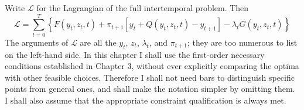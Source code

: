 Write $\mathcal{L}$ for the Lagrangian of the full intertemporal problem. Then
\begin{equation} \label{equa10.4}
\mathcal{L} = \sum\limits_{t=0}^T \left\{ F(y_t, z_t, t) + \pi_{t+1} [ y_t + Q(y_t, z_t,t) - y_{t+1} ] -\lambda_t G(y_t, z_t, t)   \right\}
\end{equation}
The arguments of $\mathcal{L}$ are all the $y_t$, $z_t$, $\lambda_t$, and $\pi_{t+1}$; they are too numerous to list on the left-hand side. In this chapter I shall use the first-order necessary conditions established in Chapter 3, without ever explicitly comparing the optima with other feasible choices. Therefore I shall not need bars to distinguish specific points from general ones, and shall make the notation simpler by omitting them. I shall also assume that the appropriate constraint qualification is always met.

